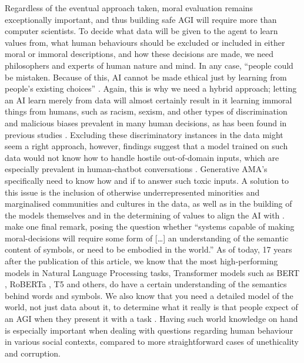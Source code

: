 \documentclass[final]{clv3} %
\begin{document}
Regardless of the eventual approach taken, moral evaluation remains exceptionally important, and thus building safe AGI will require more than computer scientists. To decide what data will be given to the agent to learn values from, what human behaviours should be excluded or included in either moral or immoral descriptions, and how these decisions are made, we need philosophers and experts of human nature and mind. In any case, “people could be mistaken. Because of this, AI cannot be made ethical just by learning from people’s existing choices” \cite[p. 6]{gabriel}. Again, this is why we need a hybrid approach; letting an AI learn merely from data will almost certainly result in it learning immoral things from humans, such as racism, sexism, and other types of discrimination and malicious biases prevalent in many human decisions, as has been found in previous studies \cite{schramowski, howard}. Excluding these discriminatory instances in the data might seem a right approach, however, findings suggest that a model trained on such data would not know how to handle hostile out-of-domain inputs, which are especially prevalent in human-chatbot conversations \cite{xu}. Generative AMA’s specifically need to know how and if to answer such toxic inputs. A solution to this issue is the inclusion of otherwise underrepresented minorities and marginalised communities and cultures in the data, as well as in the building of the models themselves and in the determining of values to align the AI with \cite{gabriel}.\\

\citet[p. 154]{allen2005} make one final remark, posing the question whether “systems capable of making moral-decisions will require some form of […] an understanding of the semantic content of symbols, or need to be embodied in the world.” As of today, 17 years after the publication of this article, we know that the most high-performing models in Natural Language Processing tasks, Transformer models such as BERT \cite{devlin}, RoBERTa \cite{liu}, T5 \cite{raffel} and others, do have a certain understanding of the semantics behind words and symbols. We also know that you need a detailed model of the world, not just data about it, to determine what it really is that people expect of an AGI when they present it with a task \cite{tegmark}. Having such world knowledge on hand is especially important when dealing with questions regarding human behaviour in various social contexts, compared to more straightforward cases of unethicality and corruption. \\
\end{document}
